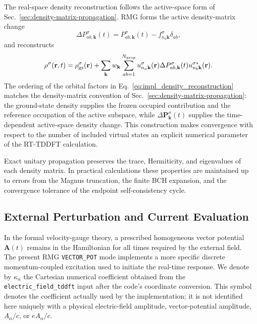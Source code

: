 The real-space density reconstruction follows the active-space form of
Sec.~\ref{sec:density-matrix-propagation}.  RMG forms the active
density-matrix change
\begin{equation}
  \Delta P_{ab,\mathbf k}^{\sigma}(t)
  =
  P_{ab,\mathbf k}^{\sigma}(t)
  -
  f_{n_a\mathbf k}^{\sigma}\delta_{ab},
  \label{eq:impl_delta_p_active}
\end{equation}
and reconstructs
\begin{equation}
  \rho^\sigma(\mathbf r,t)
  =
  \rho_{\rm gs}^{\sigma}(\mathbf r)
  +
  \sum_{\mathbf k}
  w_{\mathbf k}
  \sum_{ab=1}^{N_{\rm prop}}
  u_{n_a\mathbf k}^{\sigma}(\mathbf r)
  \Delta P_{ab,\mathbf k}^{\sigma}(t)
  u_{n_b\mathbf k}^{\sigma *}(\mathbf r).
  \label{eq:impl_density_reconstruction}
\end{equation}
The ordering of the orbital factors in
Eq.~\eqref{eq:impl_density_reconstruction} matches the density-matrix
convention of Sec.~\ref{sec:density-matrix-propagation}: the
ground-state density supplies the frozen occupied contribution and the
reference occupation of the active subspace, while
$\Delta\mathbf P_{\mathbf k}^{\sigma}(t)$ supplies the time-dependent
active-space density change.  This construction makes convergence with
respect to the number of included virtual states an explicit numerical
parameter of the RT-TDDFT calculation.

Exact unitary propagation preserves the trace, Hermiticity, and
eigenvalues of each density matrix.  In practical calculations these
properties are maintained up to errors from the Magnus truncation, the
finite BCH expansion, and the convergence tolerance of the endpoint
self-consistency cycle.

\subsection{External Perturbation and Current Evaluation}
\label{sec:implementation-perturbation-current}

In the formal velocity-gauge theory, a prescribed homogeneous vector
potential $\mathbf A(t)$ remains in the Hamiltonian for all times
required by the external field.  The present RMG \texttt{VECTOR\_POT}
mode implements a more specific discrete momentum-coupled excitation
used to initiate the real-time response.  We denote by
$\kappa_\alpha$ the Cartesian numerical coefficient obtained from the
\texttt{electric\_field\_tddft} input after the code's coordinate
conversion.  This symbol denotes the coefficient actually used by the
implementation; it is not identified here uniquely with a physical
electric-field amplitude, vector-potential amplitude, $A_\alpha/c$, or
$eA_\alpha/c$.

